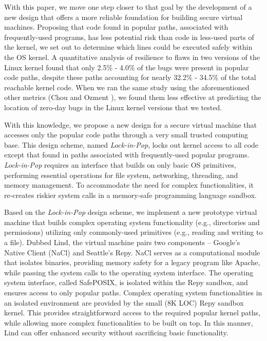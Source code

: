 With this paper, we move one step closer to that goal by the development
of a new design that offers a more reliable foundation for building secure virtual machines.
Proposing that code found in popular paths, associated with frequently-used programs,
has less potential risk than code in less-used parts of the kernel, we set out to determine
which lines could be executed safely within the OS kernel.
A quantitative analysis of resilience to flaws in two versions of the Linux kernel
found that only 2.5\% - 4.0\% of the bugs were present in popular code paths,
despite these paths accounting for nearly 32.2\% - 34.5\% of the total reachable kernel code.
When we ran the same study using the aforementioned other metrics
(Chou \cite{PittSFIeld} and Ozment \cite{ozment2006milk}),
we found them less effective at predicting the location of zero-day bugs in the
Linux kernel versions that we tested.

With this knowledge, we propose a new design for a secure virtual machine that
accesses only the popular code paths through a very small trusted computing base.
This design scheme, named \emph{Lock-in-Pop}, locks out kernel access to all code except
that found in paths associated with frequently-used popular programs. \emph{Lock-in-Pop} requires an interface
that builds on only basic OS primitives, performing essential operations for file system,
networking, threading, and memory management. 
To accommodate the need for complex functionalities, it re-creates riskier system calls in
a memory-safe programming language sandbox.

Based on the \emph{Lock-in-Pop} design scheme, we implement a new prototype virtual
 machine that builds complex operating system functionality (e.g., directories and
 permissions) utilizing only commonly-used primitives (e.g., reading and writing to a file).
Dubbed Lind, the virtual machine pairs two components -- Google's Native Client
(NaCl) and Seattle's Repy.
NaCl serves as a computational module that isolates binaries, providing memory
safety for a legacy program like Apache,
while passing the system calls  to the operating system interface.
The operating system interface, called SafePOSIX, is isolated within the Repy
sandbox, and ensures access to only popular paths.
Complex operating system functionalities in an isolated environment are
provided by the small (8K LOC) Repy sandbox kernel.
This provides straightforward access to the required popular kernel paths,
while allowing more complex functionalities to be built on top.
In this manner, Lind can offer enhanced security without sacrificing basic functionality.

